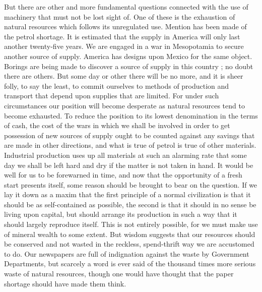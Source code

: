 \documentclass{book}
\begin{document}
But there are other and more fundamental questions connected with the use of machinery that must not be lost sight of. One of these is the exhaustion of natural resources which follows its unregulated use. Mention has been made of the petrol shortage. It is estimated that the supply in America will only last another twenty-five years. We are engaged in a war in Mesopotamia to secure another source of supply. America has designs upon Mexico for the same object. Borings are being made to discover a source of supply in this country ; no doubt there are others. But some day or other there will be no more, and it is sheer folly, to say the least, to commit ourselves to methods of production and transport that depend upon supplies that are limited. For under such circumstances our position will become desperate as natural resources tend to become exhausted. To reduce the position to its lowest denomination in the terms of cash, the cost of the wars in which we shall be involved in order to get possession of new sources of supply ought to be counted against any savings that are made in other directions, and what is true of petrol is true of other materials. Industrial production uses up all materials at such an alarming rate that some day we shall be left hard and dry if the matter is not taken in hand. It would be well for us to be forewarned in time, and now that the opportunity of a fresh start presents itself, some reason should be brought to bear on the question. If we lay it down as a maxim that the first principle of a normal civilization is that it should be as self-contained as possible, the second is that it should in no sense be living upon capital, but should arrange its production in such a way that it should largely reproduce itself. This is not entirely possible, for we must make use of mineral wealth to some extent. But wisdom suggests that our resources should be conserved and not wasted in the reckless, spend-thrift way we are accustomed to do. Our newspapers are full of indignation against the waste by Government Departments, but scarcely a word is ever said of the thousand times more serious waste of natural resources, though one would have thought that the paper shortage should have made them think.
\end{document}
